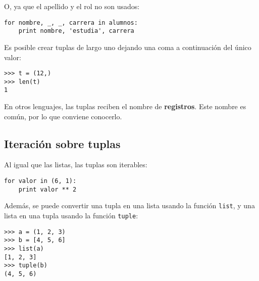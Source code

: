 O, ya que el apellido y el rol no son usados:

\begin{lstlisting}
for nombre, _, _, carrera in alumnos:
    print nombre, 'estudia', carrera
\end{lstlisting}

Es posible crear tuplas de largo uno dejando una coma a continuación del
único valor:

\begin{lstlisting}
>>> t = (12,)
>>> len(t)
1
\end{lstlisting}

En otros lenguajes, las tuplas reciben el nombre de \textbf{registros}.
Este nombre es común, por lo que conviene conocerlo.

\subsection{Iteración sobre tuplas}

Al igual que las listas, las tuplas son iterables:

\begin{lstlisting}
for valor in (6, 1):
    print valor ** 2
\end{lstlisting}

Además, se puede convertir una tupla en una lista usando la función
\lstinline!list!, y una lista en una tupla usando la función
\lstinline!tuple!:

\begin{lstlisting}
>>> a = (1, 2, 3)
>>> b = [4, 5, 6]
>>> list(a)
[1, 2, 3]
>>> tuple(b)
(4, 5, 6)
\end{lstlisting}

